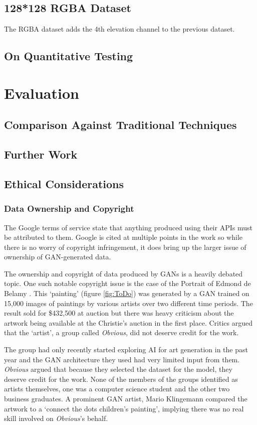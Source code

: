 \documentclass[a4paper]{report}
\begin{document}
\subsection{128*128 RGBA Dataset}
The RGBA dataset adds the 4th elevation channel to the previous dataset. 
\subsection{On Quantitative Testing}
\section{Evaluation}
\subsection{Comparison Against Traditional Techniques}
\subsection{Further Work}
\subsection{Ethical Considerations}
\subsubsection{Data Ownership and Copyright}
The Google terms of service state that anything produced using their APIs must be attributed to them. Google is cited at multiple points in the work so while there is no worry of copyright infringement, it does bring up the larger issue of ownership of GAN-generated data.

The ownership and copyright of data produced by GANs is a heavily debated topic. One such notable copyright issue is the case of the Portrait of Edmond de Belamy \cite{ToDo}. This `painting' (figure \ref{fig:ToDo}) was generated by a GAN trained on 15,000 images of paintings by various artists over two different time periods. The result sold for \$432,500 at auction but there was heavy criticism about the artwork being available at the Christie's auction in the first place. Critics argued that the `artist', a group called \textit{Obvious}, did not deserve credit for the work.

The group had only recently started exploring AI for art generation in the past year and the GAN architecture they used had very limited input from them. \textit{Obvious} argued that because they selected the dataset for the model, they deserve credit for the work. None of the members of the groups identified as artists themselves, one was a computer science student and the other two business graduates. A prominent GAN artist, Mario Klingemann compared the artwork to a  `connect the dots children's painting', implying there was no real skill involved on \textit{Obvious}'s behalf.
\end{document}
